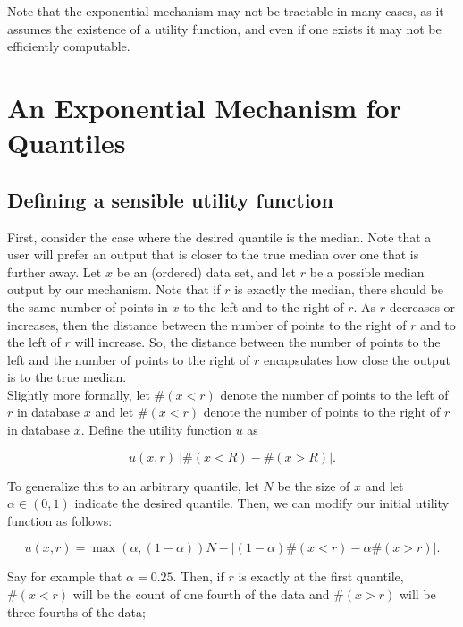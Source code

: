 \documentclass[11pt]{scrartcl} %
\begin{document}
Note that the exponential mechanism may not be tractable in many cases, as it assumes the existence of a utility function, and even if one exists it may not be efficiently computable. 

\section{An Exponential Mechanism for Quantiles}

\subsection{Defining a sensible utility function}
%
First, consider the case where the desired quantile is the median. Note that a user will prefer an output that is closer to the true median over one that is further away. Let $x$ be an (ordered) data set, and let $r$ be a possible median output by our mechanism. Note that if $r$ is exactly the median, there should be the same number of points in $x$ to the left and to the right of $r$. As $r$ decreases or increases, then the distance between the number of points to the right of $r$ and to the left of $r$ will increase. So, the distance between the number of points to the left and the number of points to the right of $r$ encapsulates how close the output is to the true median. \\

Slightly more formally, let $\#(x<r)$ denote the number of points to the left of $r$ in database $x$ and let $\#(x<r)$ denote the number of points to the right of $r$ in database $x$. Define the utility function $u$ as

\begin{equation}
u(x,r) \ \left\vert \#(x<R) - \#(x > R)\right\vert.
\end{equation}

To generalize this to an arbitrary quantile, let $N$ be the size of $x$ and let $\alpha \in (0,1)$ indicate the desired quantile. Then, we can modify our initial utility function as follows:

\begin{equation}
\label{eq:quant-util}
u(x,r) = \max(\alpha, (1-\alpha))N - \left\vert (1-\alpha) \#(x<r) - \alpha \# (x>r) \right\vert .
\end{equation}

Say for example that $\alpha = 0.25$. Then, if $r$ is exactly at the first quantile, 
$\#(x<r) $ will be the count of one fourth of the data and $\# (x>r)$ will be three fourths of the data; 
\end{document}
